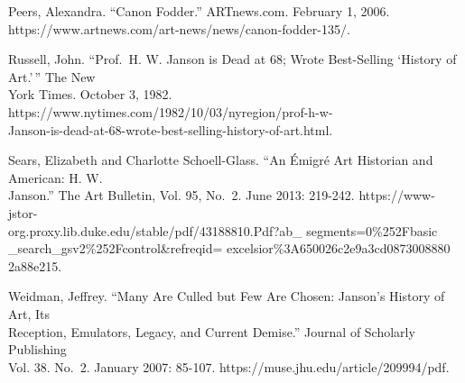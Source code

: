 \documentclass[
  letterpaper,
  DIV=11,
  numbers=noendperiod]{scrreprt}
\begin{document}
Peers, Alexandra. ``Canon Fodder.'' ARTnews.com. February 1, 2006.\\
https://www.artnews.com/art-news/news/canon-fodder-135/.~

Russell, John. ``Prof.~H. W. Janson is Dead at 68; Wrote Best-Selling
`History of Art.'\,'' The New\\
York Times. October 3, 1982.
https://www.nytimes.com/1982/10/03/nyregion/prof-h-w-\\
Janson-is-dead-at-68-wrote-best-selling-history-of-art.html.

Sears, Elizabeth and Charlotte Schoell-Glass. ``An Émigré Art Historian
and American: H. W.\\
Janson.'' The Art Bulletin, Vol. 95, No.~2. June 2013: 219-242.
https://www-jstor-\\
org.proxy.lib.duke.edu/stable/pdf/43188810.Pdf?ab\_
segments=0\%252Fbasic\\
\_search\_gsv2\%252Fcontrol\&refreqid=
excelsior\%3A650026c2e9a3cd0873008880\\
2a88e215.

Weidman, Jeffrey. ``Many Are Culled but Few Are Chosen: Janson's History
of Art, Its\\
Reception, Emulators, Legacy, and Current Demise.'' Journal of Scholarly
Publishing\\
Vol. 38. No.~2. January 2007: 85-107.
https://muse.jhu.edu/article/209994/pdf.
\end{document}
